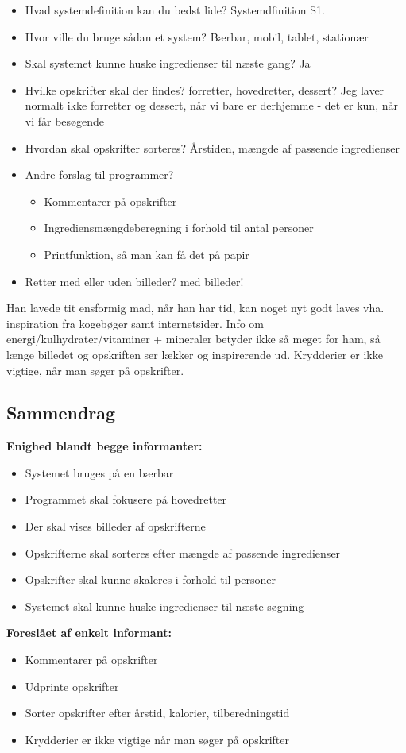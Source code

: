 \begin{description}
\begin{itemize}[noitemsep]
\item Hvad systemdefinition kan du bedst lide? Systemdfinition S1.
\item Hvor ville du bruge sådan et system? Bærbar, mobil, tablet, stationær
\item Skal systemet kunne huske ingredienser til næste gang? Ja
\item Hvilke opskrifter skal der findes? forretter, hovedretter, dessert? Jeg laver normalt ikke forretter og dessert, når vi bare er derhjemme - det er kun, når vi får besøgende
\item Hvordan skal opskrifter sorteres? Årstiden, mængde af passende ingredienser
\item Andre forslag til programmer?
\begin{itemize}[noitemsep]
\item Kommentarer på opskrifter
\item Ingrediensmængdeberegning i forhold til antal personer
\item Printfunktion, så man kan få det på papir
\end{itemize}
\item Retter med eller uden billeder? med billeder!
\end{itemize}

Han lavede tit ensformig mad, når han har tid, kan noget nyt godt laves vha. inspiration fra kogebøger samt internetsider. Info om energi/kulhydrater/vitaminer + mineraler betyder ikke så meget for ham, så længe billedet og opskriften ser lækker og inspirerende ud. Krydderier er ikke vigtige, når man søger på opskrifter.
\end{description}

\subsection{Sammendrag}

\textbf{Enighed blandt begge informanter:}
\begin{itemize}[noitemsep]
\item Systemet bruges på en bærbar
\item Programmet skal fokusere på hovedretter
\item Der skal vises billeder af opskrifterne
\item Opskrifterne skal sorteres efter mængde af passende ingredienser
\item Opskrifter skal kunne skaleres i forhold til personer
\item Systemet skal kunne huske ingredienser til næste søgning
\end{itemize} 

\textbf{Foreslået af enkelt informant:}
\begin{itemize}[noitemsep]
\item Kommentarer på opskrifter
\item Udprinte opskrifter
\item Sorter opskrifter efter årstid, kalorier, tilberedningstid
\item Krydderier er ikke vigtige når man søger på opskrifter
\end{itemize}
